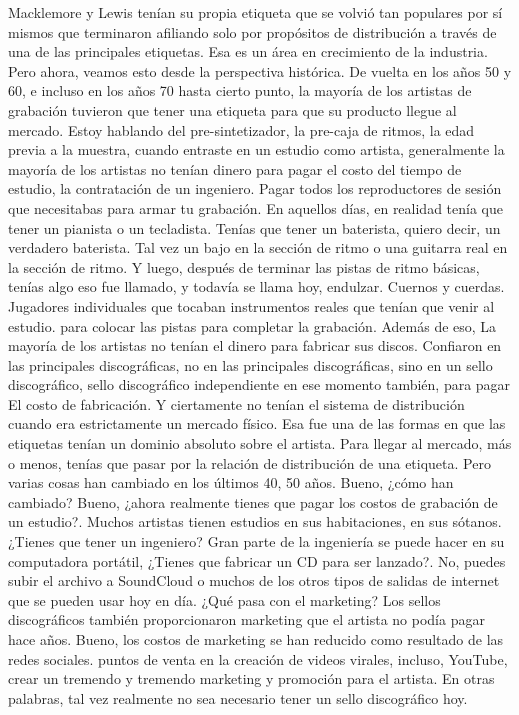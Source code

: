 \documentclass[10pt]{book}
\begin{document}
Macklemore y Lewis tenían su propia etiqueta que se volvió tan populares por sí mismos que terminaron afiliando solo por propósitos de distribución a través de una de las principales etiquetas. Esa es un área en crecimiento de la industria. Pero ahora, veamos esto desde la perspectiva histórica. De vuelta en los años 50 y 60, e incluso en los años 70 hasta cierto punto, la mayoría de los artistas de grabación tuvieron que tener una etiqueta para que su producto llegue al mercado. Estoy hablando del pre-sintetizador, la pre-caja de ritmos, la edad previa a la muestra, cuando entraste en un estudio como artista, generalmente la mayoría de los artistas no tenían dinero para pagar el costo del tiempo de estudio, la contratación de un ingeniero. Pagar todos los reproductores de sesión que necesitabas para armar tu grabación. En aquellos días, en realidad tenía que tener un pianista o un tecladista. Tenías que tener un baterista, quiero decir, un verdadero baterista. Tal vez un bajo en la sección de ritmo o una guitarra real en la sección de ritmo. Y luego, después de terminar las pistas de ritmo básicas, tenías algo eso fue llamado, y todavía se llama hoy, endulzar. Cuernos y cuerdas. Jugadores individuales que tocaban instrumentos reales que tenían que venir al estudio. para colocar las pistas para completar la grabación. Además de eso, La mayoría de los artistas no tenían el dinero para fabricar sus discos. Confiaron en las principales discográficas, no en las principales discográficas, sino en un sello discográfico, sello discográfico independiente en ese momento también, para pagar El costo de fabricación. Y ciertamente no tenían el sistema de distribución cuando era estrictamente un mercado físico. Esa fue una de las formas en que las etiquetas tenían un dominio absoluto sobre el artista. Para llegar al mercado, más o menos, tenías que pasar por la relación de distribución de una etiqueta. Pero varias cosas han cambiado en los últimos 40, 50 años. Bueno, ¿cómo han cambiado? Bueno, ¿ahora realmente tienes que pagar los costos de grabación de un estudio?. Muchos artistas tienen estudios en sus habitaciones, en sus sótanos. ¿Tienes que tener un ingeniero? Gran parte de la ingeniería se puede hacer en su computadora portátil, ¿Tienes que fabricar un CD para ser lanzado?. No, puedes subir el archivo a SoundCloud o muchos de los otros tipos de salidas de internet que se pueden usar hoy en día. ¿Qué pasa con el marketing? Los sellos discográficos también proporcionaron marketing que el artista no podía pagar hace años. Bueno, los costos de marketing se han reducido como resultado de las redes sociales. puntos de venta en la creación de videos virales, incluso, YouTube, crear un tremendo y tremendo marketing y promoción para el artista. En otras palabras, tal vez realmente no sea necesario tener un sello discográfico hoy.\\
\end{document}
